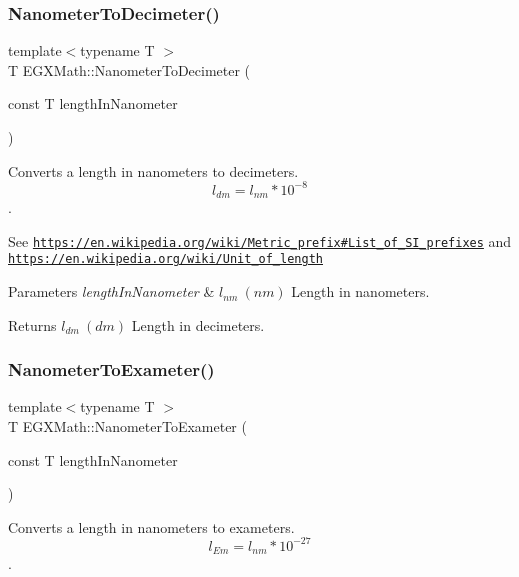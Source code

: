 \subsubsection{\texorpdfstring{Nanometer\+To\+Decimeter()}{NanometerToDecimeter()}}
{\footnotesize\ttfamily template$<$typename T $>$ \\
T E\+G\+X\+Math\+::\+Nanometer\+To\+Decimeter (\begin{DoxyParamCaption}\item[{const T}]{length\+In\+Nanometer }\end{DoxyParamCaption})}



Converts a length in nanometers to decimeters. \[ l_{dm}=l_{nm} * 10^{-8} \]. 

See \href{https://en.wikipedia.org/wiki/Metric_prefix#List_of_SI_prefixes}{\tt https\+://en.\+wikipedia.\+org/wiki/\+Metric\+\_\+prefix\#\+List\+\_\+of\+\_\+\+S\+I\+\_\+prefixes} and \href{https://en.wikipedia.org/wiki/Unit_of_length}{\tt https\+://en.\+wikipedia.\+org/wiki/\+Unit\+\_\+of\+\_\+length} 
\begin{DoxyParams}{Parameters}
{\em length\+In\+Nanometer} & $ l_{nm}\ (nm)$ Length in nanometers. \\
\hline
\end{DoxyParams}
\begin{DoxyReturn}{Returns}
$ l_{dm}\ (dm)$ Length in decimeters. 
\end{DoxyReturn}
\mbox{\label{group___e_g_x_math-_conversions-_length_conversions-_s_i-_nanometer-_s_i_ga27316ac700548a2bcf058bb4f098f4e2}} 
\subsubsection{\texorpdfstring{Nanometer\+To\+Exameter()}{NanometerToExameter()}}
{\footnotesize\ttfamily template$<$typename T $>$ \\
T E\+G\+X\+Math\+::\+Nanometer\+To\+Exameter (\begin{DoxyParamCaption}\item[{const T}]{length\+In\+Nanometer }\end{DoxyParamCaption})}



Converts a length in nanometers to exameters. \[ l_{Em}=l_{nm} * 10^{-27} \]. 

